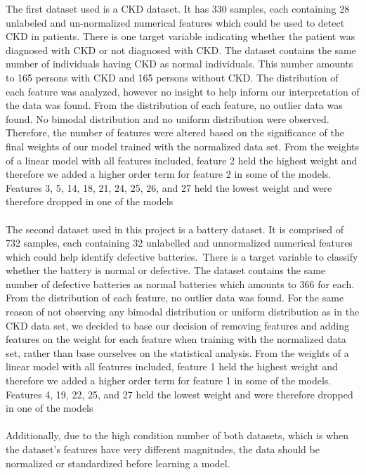 \documentclass{article}
\begin{document}
The first dataset used is a CKD dataset. It has 330 samples, each containing 28 unlabeled and un-normalized numerical features which could be used to detect CKD in patients.  There is one target variable indicating whether the patient was diagnosed with CKD or not diagnosed with CKD. The dataset contains the same number of individuals having CKD as normal individuals. This number amounts to 165 persons with CKD and 165 persons without CKD. The distribution of each feature was analyzed, however no insight to help inform our interpretation of the data was found. From the distribution of each feature, no outlier data was found. No bimodal distribution and no uniform distribution were observed. Therefore, the number of features were altered based on the significance of the final weights of our model trained with the normalized data set.  From the weights of a linear model with all features included, feature 2 held the highest weight and therefore we added a higher order term for feature 2 in some of the models.  Features 3, 5, 14, 18, 21, 24, 25, 26, and 27 held the lowest weight and were therefore dropped in one of the models 
\\
\\
The second dataset used in this project is a battery dataset. It is comprised of 732 samples, each containing 32 unlabelled and unnormalized numerical features which could help identify defective batteries.  There is a target variable to classify whether the battery is normal or defective. The dataset contains the same number of defective batteries as normal batteries which amounts to 366 for each. From the distribution of each feature, no outlier data was found. For the same reason of not observing any bimodal distribution or uniform distribution as in the CKD data set, we decided to base our decision of removing features and adding features on the weight for each feature when training with the normalized data set, rather than base ourselves on the statistical analysis.  From the weights of a linear model with all features included, feature 1 held the highest weight and therefore we added a higher order term for feature 1 in some of the models.  Features 4, 19, 22, 25, and 27 held the lowest weight and were therefore dropped in one of the models 
\\
\\
Additionally, due to the high condition number of both datasets, which is when the dataset's features have very different magnitudes, the data should be normalized or standardized before learning a model. 
\end{document}
